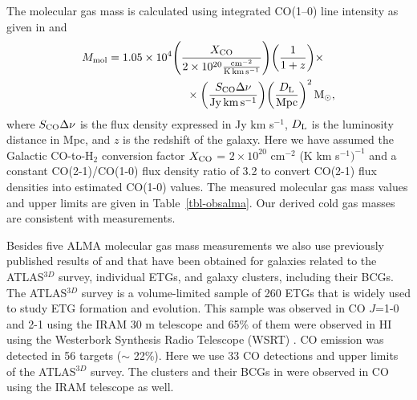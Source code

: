 \documentclass[iop]{emulateapj}
\begin{document}
The molecular gas mass is calculated using integrated CO(1--0) line intensity as given in \citet{Solomon:05} and \citet{Bolatto:13}
\begin{equation}
\begin{multlined}
M_{\rm mol} = 1.05 \times 10^{4} \Bigg(\frac{X_{\rm CO}}{2 \times 10^{20} \frac{\rm cm^{-2}}{\rm K\, km\, s^{-1}}}\Bigg) \bigg(\frac{1}{1+z}\bigg) \times \\ \times \bigg(\frac{S_{\rm CO} \Delta \nu}{\rm Jy\, km\, s^{-1}}\bigg)
\bigg(\frac{D_{\rm L}}{\rm Mpc}\bigg)^{2}\, {\rm M_{\odot}},
\end{multlined}
\end{equation}
where $S_{\rm CO} \Delta \nu$ is the flux density expressed in Jy km s$^{-1}$, $D_{\rm L}$ is the luminosity distance in Mpc, and $z$ is the redshift of the galaxy. Here we have assumed the Galactic CO-to-H$_{2}$ conversion factor $X_{\rm CO}$ = $2 \times 10^{20}$ cm$^{-2}$ (K km s$^{-1})^{-1}$ and a constant CO(2-1)/CO(1-0) flux density ratio of 3.2 to convert CO(2-1) flux densities into estimated CO(1-0) values. The measured molecular gas mass values and upper limits are given in Table~\ref{tbl-obsalma}. Our derived cold gas masses are consistent with \citet{Boz} measurements.

Besides five ALMA molecular gas mass measurements we also use previously published results of \citet{Young:11, Su:13, Boz} and \citet{Pulido:17} that have been obtained for galaxies related to the ATLAS${}^{3D}$ survey, individual ETGs, and galaxy clusters, including their BCGs. The ATLAS${}^{3D}$ survey is a volume-limited sample of 260 ETGs that is widely used to study ETG formation and evolution. This sample was observed in CO $J$=1-0 and 2-1 using the IRAM 30 m telescope \citep{Young:11} and 65\% of them were observed in HI using the Westerbork Synthesis Radio Telescope (WSRT) \citep{Morganti:06, Serra:12}. CO emission was detected in 56 targets ($\sim$ 22\%). Here we use 33 CO detections and upper limits of the ATLAS${}^{3D}$ survey. The clusters and their BCGs in \citet{Pulido:17} were observed in CO using the IRAM telescope as well.
\end{document}
